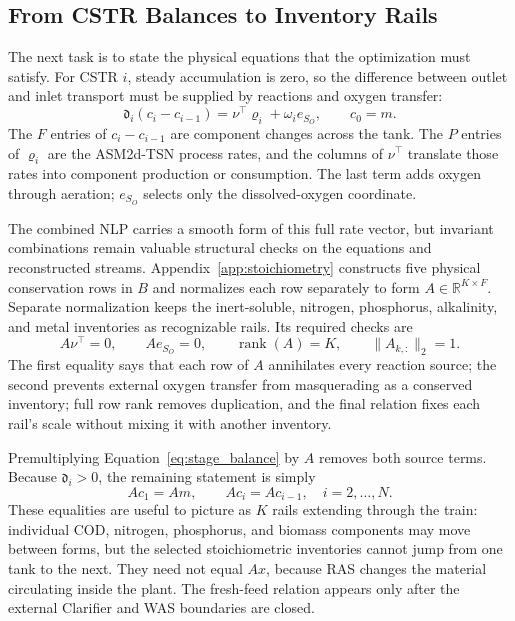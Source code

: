 \documentclass[a4paper,fleqn]{cas-sc}
\newcommand{\R}{\mathbb{R}}
\begin{document}
\subsection{From CSTR Balances to Inventory Rails}

The next task is to state the physical equations that the optimization must satisfy. For CSTR $i$, steady accumulation is zero, so the difference between outlet and inlet transport must be supplied by reactions and oxygen transfer:
\begin{equation}
\label{eq:stage_balance}
\mathfrak d_i(c_i-c_{i-1})=\nu^\top\varrho_i+\omega_i e_{S_O},
\qquad c_0=m.
\end{equation}
The $F$ entries of $c_i-c_{i-1}$ are component changes across the tank. The $P$ entries of $\varrho_i$ are the ASM2d-TSN process rates, and the columns of $\nu^\top$ translate those rates into component production or consumption. The last term adds oxygen through aeration; $e_{S_O}$ selects only the dissolved-oxygen coordinate.

The combined NLP carries a smooth form of this full rate vector, but invariant combinations remain valuable structural checks on the equations and reconstructed streams. Appendix~\ref{app:stoichiometry} constructs five physical conservation rows in $B$ and normalizes each row separately to form $A\in\R^{K\times F}$. Separate normalization keeps the inert-soluble, nitrogen, phosphorus, alkalinity, and metal inventories as recognizable rails. Its required checks are
\begin{equation}
\label{eq:invariant_conditions}
A\nu^\top=0,\qquad Ae_{S_O}=0,\qquad
\operatorname{rank}(A)=K,\qquad \|A_{k,:}\|_2=1.
\end{equation}
The first equality says that each row of $A$ annihilates every reaction source; the second prevents external oxygen transfer from masquerading as a conserved inventory; full row rank removes duplication, and the final relation fixes each rail's scale without mixing it with another inventory.

Premultiplying Equation~\eqref{eq:stage_balance} by $A$ removes both source terms. Because $\mathfrak d_i>0$, the remaining statement is simply
\begin{equation}
\label{eq:stage_invariants}
Ac_1=Am,\qquad
Ac_i=Ac_{i-1},\quad i=2,\ldots,N.
\end{equation}
These equalities are useful to picture as $K$ rails extending through the train: individual COD, nitrogen, phosphorus, and biomass components may move between forms, but the selected stoichiometric inventories cannot jump from one tank to the next. They need not equal $Ax$, because RAS changes the material circulating inside the plant. The fresh-feed relation appears only after the external Clarifier and WAS boundaries are closed.
\end{document}
